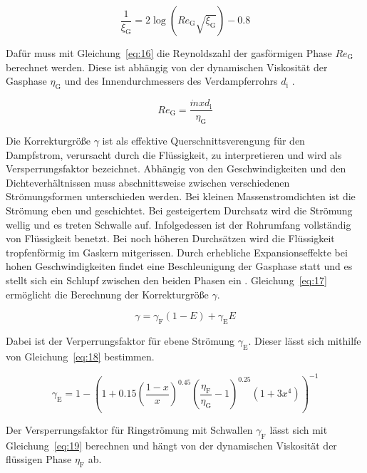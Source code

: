 \begin{equation}
\label{eq:15}
\frac{1}{\xi_\mathrm{G}} = 2\log(Re_\mathrm{G} \sqrt{\xi_\mathrm{G}})-0.8
\end{equation}

Dafür muss mit Gleichung~\ref{eq:16} die Reynoldszahl der gasförmigen Phase $Re_\mathrm{G}$ berechnet werden. Diese ist abhängig von der dynamischen Viskosität der Gasphase $\eta_\mathrm{G}$ und des Innendurchmessers des Verdampferrohrs $d_\mathrm{i}$ \cite{Awad.2012}.

\begin{equation}
\label{eq:16}
Re_\mathrm{G} = \frac{\dot{m} x d_\mathrm{i}}{\eta_\mathrm{G}}
\end{equation}

Die Korrekturgröße $\gamma$ ist als effektive Querschnittsverengung für den Dampfstrom, verursacht durch die Flüssigkeit, zu interpretieren und wird als Versperrungsfaktor bezeichnet. Abhängig von den Geschwindigkeiten und den Dichteverhältnissen muss abschnittsweise zwischen verschiedenen Strömungsformen unterschieden werden. Bei kleinen Massenstromdichten ist die Strömung eben und geschichtet. Bei gesteigertem Durchsatz wird die Strömung wellig und es treten Schwalle auf. Infolgedessen ist der Rohrumfang vollständig von Flüssigkeit benetzt. Bei noch höheren Durchsätzen wird die Flüssigkeit tropfenförmig im Gaskern mitgerissen. Durch erhebliche Expansionseffekte bei hohen Geschwindigkeiten findet eine Beschleunigung der Gasphase statt und es stellt sich ein Schlupf zwischen den beiden Phasen ein \cite{Kesper.1976}.
Gleichung~\ref{eq:17} ermöglicht die Berechnung der Korrekturgröße $\gamma$.

\begin{equation}
\label{eq:17}
\gamma = \gamma_\mathrm{F}(1-E) + \gamma_\mathrm{E} E
\end{equation}

Dabei ist der Verperrungsfaktor für ebene Strömung $\gamma_\mathrm{E}$. Dieser lässt sich mithilfe von Gleichung~\ref{eq:18} bestimmen.

\begin{equation}
\label{eq:18}
\gamma_\mathrm{E} = 1 - \left( 1+0.15 \left( \frac{1-x}{x} \right)^{0.45} \left( \frac{\eta_\mathrm{F}}{\eta_\mathrm{G}}-1 \right)^{0.25} (1 + 3x^4)\right)^{-1}
\end{equation}


Der Versperrungsfaktor für Ringströmung mit Schwallen $\gamma_\mathrm{F}$ lässt sich mit Gleichung~\ref{eq:19} berechnen und hängt von der dynamischen Viskosität der flüssigen Phase $\eta_\mathrm{F}$ ab.

